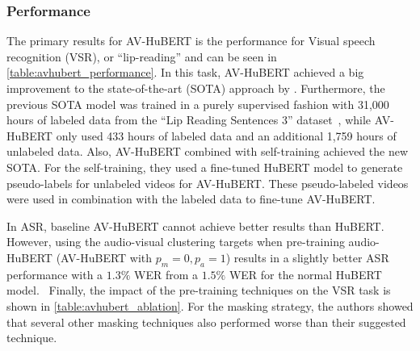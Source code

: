 \subsubsection{Performance}
The primary results for AV-HuBERT is the performance for Visual speech recognition (VSR), or ``lip-reading'' and can be seen in \ref{table:avhubert_performance}. In this task, AV-HuBERT achieved a big improvement to the state-of-the-art (SOTA) approach by \cite{makino-etal-2021-neural}. Furthermore, the previous SOTA model was trained in a purely supervised fashion with 31,000 hours of labeled data from the ``Lip Reading Sentences 3'' dataset~\cite{afouras2018lrs3ted}, while AV-HuBERT only used 433 hours of labeled data and an additional 1,759 hours of unlabeled data. Also, AV-HuBERT combined with self-training achieved the new SOTA. For the self-training, they used a fine-tuned HuBERT model to generate pseudo-labels for unlabeled videos for AV-HuBERT. These pseudo-labeled videos were used in combination with the labeled data to fine-tune AV-HuBERT.

\begin{table}[htbp]
    \caption{\label{table:avhubert_performance}Visual speech recognition (VSR, ``Lip-Reading'') Performance (Excerpt from \cite{AV_HuBERT}). Conformer: Convolution-augmented Transformer, ST: self-training.}
\end{table}

In ASR, baseline AV-HuBERT cannot achieve better results than HuBERT. However, using the audio-visual clustering targets when pre-training audio-HuBERT (AV-HuBERT with $p_m=0,p_a=1$) results in a slightly better ASR performance with a $1.3\%$ WER from a $1.5\%$ WER for the normal HuBERT model.~\cite{AV_HuBERT}
Finally, the impact of the pre-training techniques on the VSR task is shown in \ref{table:avhubert_ablation}. For the masking strategy, the authors showed that several other masking techniques also performed worse than their suggested technique.


